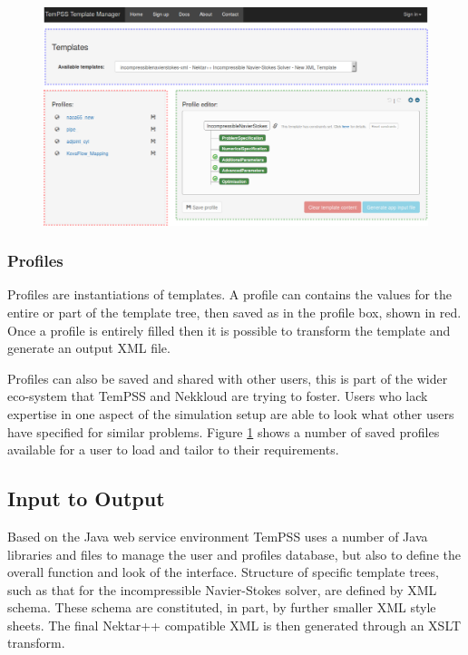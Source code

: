 \documentclass[11pt, a4paper]{report}
\begin{document}
\begin{figure}[htb!]
 \centering
 \includegraphics[width=.85\linewidth,  clip=true, trim = 0cm 0cm 0cm 0cm]{TemPSS_interface}
 \label{fig:TemPSS_interface}
\end{figure}

\subsubsection{Profiles}
Profiles are instantiations of templates. A profile can contains the values for the entire or part of the template tree, then saved as in the profile box, shown in \textcolor{myred}{red}. Once a profile is entirely filled then it is possible to transform the template and generate an output XML file.

Profiles can also be saved and shared with other users, this is part of the wider eco-system that TemPSS and Nekkloud are trying to foster. Users who lack expertise in one aspect of the simulation setup are able to look what other users have specified for similar problems. Figure \ref{fig:TemPSS_interface} shows a number of saved profiles available for a user to load and tailor to their requirements.

\subsection{Input to Output}
Based on the Java web service environment TemPSS uses a number of Java libraries and files to manage the user and profiles database, but also to define the overall function and look of the interface. Structure of specific template trees, such as that for the incompressible Navier-Stokes solver, are defined by XML schema. These schema are constituted, in part, by further smaller XML style sheets. The final Nektar++ compatible XML is then generated through an XSLT transform.
\end{document}
